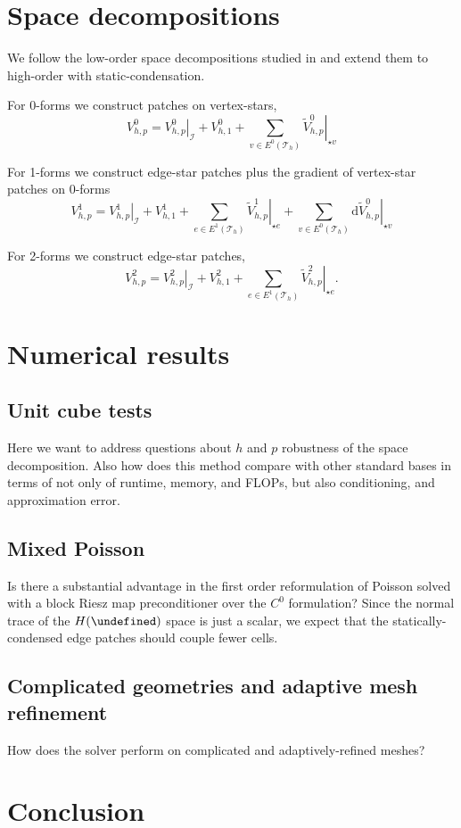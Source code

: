 \documentclass[review,onefignum,onetabnum,a4paper]{siamart190516}
\let\div\undefined
\DeclareMathOperator{\div}{div}
\newcommand{\Hdiv}{H(\div)}
\newcommand{\mesh}{\mathcal{T}_h}
\begin{document}
\section{Space decompositions}


We follow 
the low-order space decompositions studied in \cite{arnold00}
and extend them to high-order with static-condensation.

For 0-forms we construct patches on vertex-stars,
\begin{equation}
   V^0_{h,p} = \left.V^0_{h,p}\right|_\mathcal{I} + V^0_{h,1} 
   + \sum_{v\in E^0(\mesh)} \left.\tilde{V}^0_{h,p}\right|_{\star v} 
\end{equation}

For 1-forms we construct edge-star patches
plus the gradient of vertex-star patches on 0-forms
\begin{equation}
   V^1_{h,p} = \left.V^1_{h,p}\right|_\mathcal{I} +  V^1_{h,1}
   + \sum_{e\in E^1(\mesh)} \left.\tilde{V}^1_{h,p}\right|_{\star e} 
   + \sum_{v\in E^0(\mesh)} \mathrm{d} \left.\tilde{V}^0_{h,p}\right|_{\star v} 
\end{equation}

For 2-forms we construct edge-star patches,
\begin{equation}
   V^2_{h,p} = \left.V^2_{h,p}\right|_\mathcal{I} +  V^2_{h,1} 
   + \sum_{e\in E^1(\mesh)} \left.\tilde{V}^2_{h,p}\right|_{\star e}. 
\end{equation}



\section{Numerical results} \label{sec:results}

\subsection{Unit cube tests}
Here we want to address questions about $h$ and $p$ robustness of the space
decomposition. Also how does this method compare with other standard bases in
terms of not only of runtime, memory, and FLOPs, but also conditioning, and
approximation error.

\subsection{Mixed Poisson}
Is there a substantial advantage in the first order reformulation of Poisson solved
with a block Riesz map preconditioner over the $C^0$ formulation?
Since the normal trace of the $\Hdiv$ space is just a scalar, we expect that the
statically-condensed edge patches should couple fewer cells.


\subsection{Complicated geometries and adaptive mesh refinement}
How does the solver perform on complicated and adaptively-refined meshes?


\section{Conclusion} \label{sec:conclusion}





\end{document}
